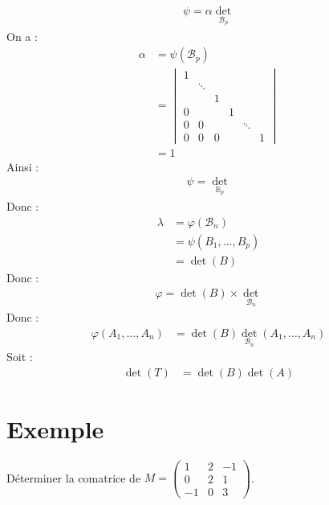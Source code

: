 \documentclass[../main.tex]{subfiles}
\begin{document}
\begin{align*}
    \psi = \alpha \operatorname{det}_{\mathcal{B}_p}
\end{align*}
On a : 
\begin{align*}
    \alpha &= \psi(\mathcal{B}_p) \\
    &= \begin{vmatrix}
        1 & & & & & \\
        & \ddots & & & & \\
        & & 1 & & & \\
        0 & & & 1 & & \\
        0 & 0 & & & \ddots \\
        0 & 0 & 0 & & & 1
    \end{vmatrix} \\
    &= 1
\end{align*}
Ainsi : 
\begin{align*}
    \psi = \operatorname{det}_{\mathbb{B}_p}
\end{align*}
Donc : 
\begin{align*}
    \lambda &= \varphi(\mathcal{B}_n) \\
    &= \psi(B_1, \ldots, B_p) \\
    &= \operatorname{det}(B)
\end{align*}
Donc : 
\begin{align*}
    \varphi = \operatorname{det}(B) \times \operatorname{det}_{\mathcal{B}_n}
\end{align*}
Donc : 
\begin{align*}
    \varphi(A_1, \ldots, A_n) &= \operatorname{det}(B) \operatorname{det}_{\mathcal{B}_n}(A_1, \ldots, A_n)
\end{align*}
Soit : 
\begin{align*}
    \operatorname{det}(T) &= \operatorname{det}(B) \operatorname{det}(A)
\end{align*}

\section{Exemple}
\begin{tcolorbox}[title=Exemple 30.57, title filled=false, colframe=darkgreen, colback=darkgreen!10!white]
    Déterminer la comatrice de $M = \begin{pmatrix}
        1 & 2 & -1 \\
        0 & 2 & 1 \\
        -1 & 0 & 3
    \end{pmatrix}$. 
\end{tcolorbox}
\end{document}
